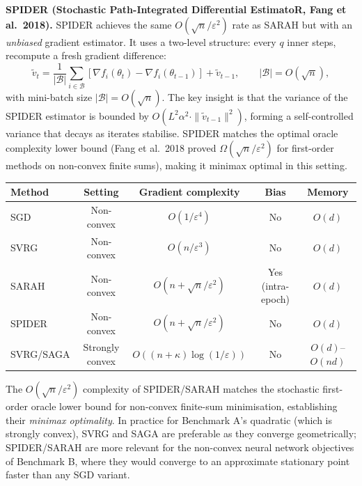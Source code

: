 \documentclass[11pt,a4paper]{article}
\theoremstyle{definition}
\begin{document}
\noindent\textbf{SPIDER (Stochastic Path-Integrated Differential EstimatoR, Fang et al.\ 2018).} SPIDER achieves the same $O(\sqrt{n}/\varepsilon^2)$ rate as SARAH but with an \emph{unbiased} gradient estimator. It uses a two-level structure: every $q$ inner steps, recompute a fresh gradient difference:
\begin{equation}
\tilde{v}_t = \frac{1}{|\mathcal{B}|}\sum_{i \in \mathcal{B}}\left[\nabla f_i(\theta_t) - \nabla f_i(\theta_{t-1})\right] + \tilde{v}_{t-1}, \qquad |\mathcal{B}| = O(\sqrt{n}),
\label{eq:spider_update}
\end{equation}
with mini-batch size $|\mathcal{B}| = O(\sqrt{n})$. The key insight is that the variance of the SPIDER estimator is bounded by $O(L^2\alpha^2 \cdot \|\tilde{v}_{t-1}\|^2)$, forming a self-controlled variance that decays as iterates stabilise. SPIDER matches the optimal oracle complexity lower bound (Fang et al.\ 2018 proved $\Omega(\sqrt{n}/\varepsilon^2)$ for first-order methods on non-convex finite sums), making it minimax optimal in this setting.

\begin{center}
\begin{tabular}{lcccc}
\toprule
Method & Setting & Gradient complexity & Bias & Memory \\
\midrule
SGD & Non-convex & $O(1/\varepsilon^4)$ & No & $O(d)$ \\
SVRG & Non-convex & $O(n/\varepsilon^3)$ & No & $O(d)$ \\
SARAH & Non-convex & $O(n + \sqrt{n}/\varepsilon^2)$ & Yes (intra-epoch) & $O(d)$ \\
SPIDER & Non-convex & $O(n + \sqrt{n}/\varepsilon^2)$ & No & $O(d)$ \\
SVRG/SAGA & Strongly convex & $O((n{+}\kappa)\log(1/\varepsilon))$ & No & $O(d)$--$O(nd)$ \\
\bottomrule
\end{tabular}
\end{center}

The $O(\sqrt{n}/\varepsilon^2)$ complexity of SPIDER/SARAH matches the stochastic first-order oracle lower bound for non-convex finite-sum minimisation, establishing their \emph{minimax optimality}. In practice for Benchmark A's quadratic (which is strongly convex), SVRG and SAGA are preferable as they converge geometrically; SPIDER/SARAH are more relevant for the non-convex neural network objectives of Benchmark B, where they would converge to an approximate stationary point faster than any SGD variant.
\end{document}
